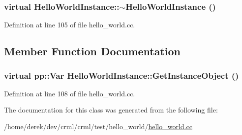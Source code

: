 \hypertarget{class_hello_world_instance_ab82a0f1aa35b3f8fbc2e107af026bfc5}{
\subsubsection[{$\sim$HelloWorldInstance}]{\setlength{\rightskip}{0pt plus 5cm}virtual HelloWorldInstance::$\sim$HelloWorldInstance ()}}
\label{class_hello_world_instance_ab82a0f1aa35b3f8fbc2e107af026bfc5}


Definition at line 105 of file hello\_\-world.cc.



\subsection{Member Function Documentation}
\hypertarget{class_hello_world_instance_ac489a6775aead72dc1b17d22d1eb6688}{
\subsubsection[{GetInstanceObject}]{\setlength{\rightskip}{0pt plus 5cm}virtual pp::Var HelloWorldInstance::GetInstanceObject ()}}
\label{class_hello_world_instance_ac489a6775aead72dc1b17d22d1eb6688}


Definition at line 108 of file hello\_\-world.cc.



The documentation for this class was generated from the following file:\begin{DoxyCompactItemize}
\item 
/home/derek/dev/crml/crml/test/hello\_\-world/\hyperlink{hello__world_8cc}{hello\_\-world.cc}\end{DoxyCompactItemize}
